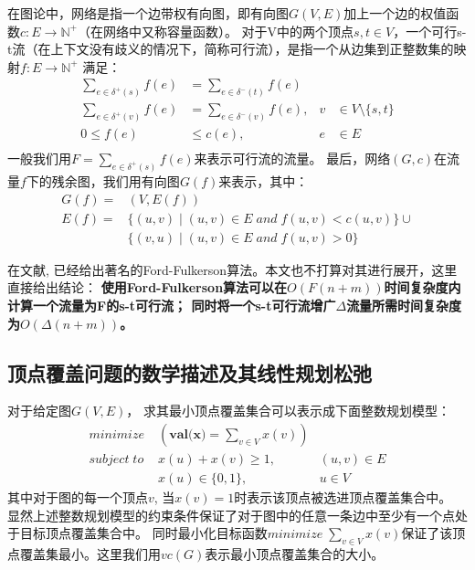 在图论中，网络是指一个边带权有向图，即有向图$G(V, E)$加上一个边的权值函数$c: E \rightarrow \mathbb{N}^+$（在网络中又称容量函数）。
对于V中的两个顶点$s, t \in V$，一个可行s-t流（在上下文没有歧义的情况下，简称可行流），是指一个从边集到正整数集的映射$f: E \rightarrow \mathbb{N}^+$ 满足：
\begin{equation} \label{EquationFlow} \begin{aligned}
  \sum_{e\in \delta^+(s)}{f(e)}&=\sum_{e\in \delta^-(t)}{f(e)}& \\
  \sum_{e\in \delta^+(v)}{f(e)}&=\sum_{e\in \delta^-(v)}{f(e)}, & v &\in V \setminus \{s, t\} \\
  0 \le f(e) &\le c(e), & e &\in E \\
\end{aligned} \end{equation}
一般我们用$F=\sum_{e\in \delta^+(s)}{f(e)}$来表示可行流的流量。
最后，网络$(G, c)$在流量$f$下的残余图，我们用有向图$G(f)$来表示，其中：
\begin{equation*} \begin{aligned}
  G(f) = &(V, E(f)) \\
  E(f) = &\{(u,v)\;|\;(u, v) \in E\;and\;f(u, v) < c(u, v)\} \cup \\
  &\{(v,u)\;|\;(u, v) \in E\;and\;f(u, v) > 0\}
\end{aligned} \end{equation*}

在文献\cite{ford1962flows}, 已经给出著名的Ford-Fulkerson算法。本文也不打算对其进行展开，这里直接给出结论：
\textbf{使用Ford-Fulkerson算法可以在$O(F(n + m))$时间复杂度内计算一个流量为F的s-t可行流；
同时将一个s-t可行流增广$\Delta$流量所需时间复杂度为$O(\Delta(n + m))$。}

\subsection{顶点覆盖问题的数学描述及其线性规划松弛}
对于给定图$G(V, E)$， 求其最小顶点覆盖集合可以表示成下面整数规划模型：
\begin{equation} \label{ModelLPVC1} \begin{aligned}
  minimize\; & (\textbf{val(x)} = \sum_{v \in V}{x(v)}) &\\
  subject\; to\; & x(u) + x(v) \ge 1, &(u, v) \in E \\
   & x(u) \in \{0, 1\}, & u \in V
\end{aligned} \end{equation}
其中对于图的每一个顶点$v$, 当$x(v) = 1$时表示该顶点被选进顶点覆盖集合中。
显然上述整数规划模型的约束条件保证了对于图中的任意一条边中至少有一个点处于目标顶点覆盖集合中。
同时最小化目标函数$minimize\; \sum_{v \in V}{x(v)}$保证了该顶点覆盖集最小。这里我们用$vc(G)$表示最小顶点覆盖集合的大小。

